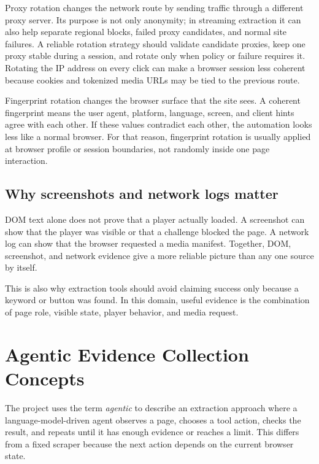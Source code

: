 Proxy rotation changes the network route by sending traffic through a different proxy
server. Its purpose is not only anonymity; in streaming extraction it can also help
separate regional blocks, failed proxy candidates, and normal site failures. A reliable
rotation strategy should validate candidate proxies, keep one proxy stable during a
session, and rotate only when policy or failure requires it. Rotating the IP address on
every click can make a browser session less coherent because cookies and tokenized media
URLs may be tied to the previous route.

Fingerprint rotation changes the browser surface that the site sees. A coherent
fingerprint means the user agent, platform, language, screen, and client hints agree
with each other. If these values contradict each other, the automation looks less like a
normal browser. For that reason, fingerprint rotation is usually applied at browser
profile or session boundaries, not randomly inside one page interaction.



\subsection{Why screenshots and network logs matter}

DOM text alone does not prove that a player actually loaded. A screenshot can show that
the player was visible or that a challenge blocked the page. A network log can show that
the browser requested a media manifest. Together, DOM, screenshot, and network evidence
give a more reliable picture than any one source by itself.

This is also why extraction tools should avoid claiming success only because a keyword
or button was found. In this domain, useful evidence is the combination of page role,
visible state, player behavior, and media request.

\section{Agentic Evidence Collection Concepts}

The project uses the term \emph{agentic} to describe an extraction approach where a
language-model-driven agent observes a page, chooses a tool action, checks the result,
and repeats until it has enough evidence or reaches a limit. This differs from a fixed
scraper because the next action depends on the current browser state.

